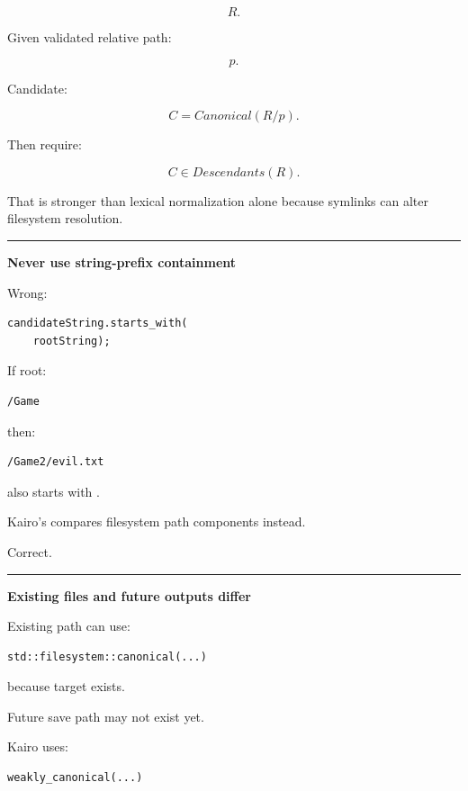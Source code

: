 \[
R.
\]

Given validated relative path:

\[
p.
\]

Candidate:

\[
C=Canonical(R/p).
\]

Then require:

\[
C\in Descendants(R).
\]

That is stronger than lexical normalization alone because symlinks can alter filesystem resolution.

\begin{center}\rule{0.5\linewidth}{0.5pt}\end{center}

\textbf{Never use string-prefix containment}

Wrong:

\begin{verbatim}
candidateString.starts_with(
    rootString);
\end{verbatim}

If root:

\begin{verbatim}
/Game
\end{verbatim}

then:

\begin{verbatim}
/Game2/evil.txt
\end{verbatim}

also starts with .

Kairo's  compares filesystem path components instead.

Correct.

\begin{center}\rule{0.5\linewidth}{0.5pt}\end{center}

\textbf{Existing files and future outputs differ}

Existing path can use:

\begin{verbatim}
std::filesystem::canonical(...)
\end{verbatim}

because target exists.

Future save path may not exist yet.

Kairo uses:

\begin{verbatim}
weakly_canonical(...)
\end{verbatim}

